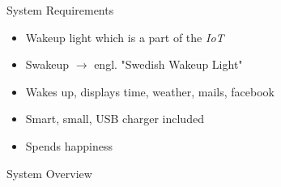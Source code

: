 \documentclass[apectratio=169]{beamer}
\begin{document}
  	\begin{frame}{System Requirements}
		\begin{itemize}
			\item<1-> Wakeup light which is a part of the \textit{IoT}
			\item<2-> Swakeup \ensuremath{\rightarrow} engl. "Swedish Wakeup Light"
			\item<3-> Wakes up, displays time, weather, mails, facebook
			\item<4-> Smart, small, USB charger included
			\item<5-> Spends happiness
		\end{itemize}
  	\end{frame}
  	\begin{frame}{System Overview}	
		\begin{figure}
			\centering

\end{figure}
\end{frame}
\end{document}
